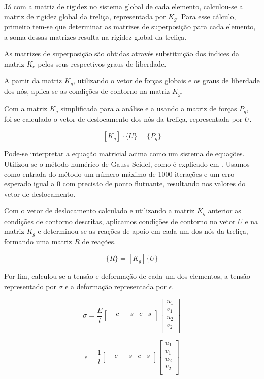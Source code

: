 \documentclass[paper=a4, fontsize=11pt]{scrartcl}
\begin{document}
Já com a matriz de rigidez no sistema global de cada elemento, calculou-se a matriz de rigidez global da treliça, representada por \(K_g\). Para esse cálculo, primeiro tem-se que determinar as matrizes de superposição para cada elemento, a soma dessas matrizes resulta na rigidez global da treliça.

As matrizes de superposição são obtidas através substituição dos índices da matriz \(K_e\) pelos seus respectivos graus de liberdade.

A partir da matriz \(K_g\), utilizando o vetor de forças globais e os graus de liberdade dos nós, aplica-se as condições de contorno na matriz \(K_g\).

Com a matriz \(K_g\) simplificada para a análise e a usando a matriz de forças \(P_g\), foi-se calculado o vetor de deslocamento dos nós da treliça, representada por \(U\).

\[[K_g]\cdot\{U\} = \{P_g\}\]

Pode-se interpretar a equação matricial acima como um sistema de equações. Utilizou-se o método numérico de Gauss-Seidel, como é explicado em \cite{gauss_seidel}. Usamos como entrada do método um número máximo de 1000 iterações e um erro esperado igual a 0 com precisão de ponto flutuante, resultando nos valores do vetor de deslocamento.

Com o vetor de deslocamento calculado e utilizando a matriz \(K_g\) anterior as condições de contorno descritas, aplicamos condições de contorno no vetor \(U\) e na matriz \(K_g\) e determinou-se as reações de apoio em cada um dos nós da treliça, formando uma matriz \(R\) de reações.

\[\{R\} = [K_g] \{U\}\]

Por fim, calculou-se a tensão e deformação de cada um dos elementos, a tensão representado por \(\sigma\) e a deformação representada por \(\epsilon\).

\[\sigma = \frac{E}{l}
\begin{bmatrix}
-c & -s & c & s\\
\end{bmatrix}
\begin{bmatrix}
u_1 \\
v_1 \\
u_2 \\
v_2 \\
\end{bmatrix}
\]


\[\epsilon = \frac{1}{l}
\begin{bmatrix}
-c & -s & c & s\\
\end{bmatrix}
\begin{bmatrix}
u_1 \\
v_1 \\
u_2 \\
v_2 \\
\end{bmatrix}
\]
\end{document}
